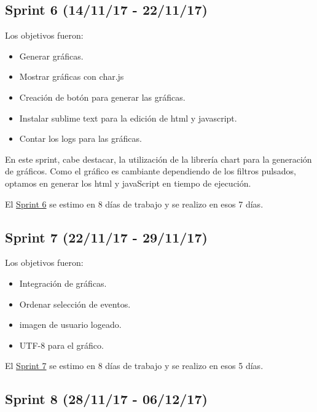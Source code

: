 \subsection{Sprint 6 (14/11/17 -
	22/11/17)}\label{sprint-6-141117---221117}

Los objetivos fueron:
\begin{itemize}
	\tightlist
	\item
	Generar gráficas.
	\item
	Mostrar gráficas con char.js \cite{javascript:chart}
	\item
	Creación de botón para generar las gráficas.	
	\item
	Instalar sublime text para la edición de html y javascript.
	\item
	Contar los logs para las gráficas.
	
\end{itemize}

En este sprint, cabe destacar, la utilización de la librería chart para la generación de gráficos. Como el gráfico es cambiante dependiendo de los filtros pulsados, optamos en generar los html y javaScript en tiempo de ejecución.

El \href{https://github.com/trona85/GII-17.1B-UBULog-1.0/milestone/6?closed=1}{Sprint 6} se estimo en 8 días de trabajo y se realizo en esos 7 días.


\subsection{Sprint 7 (22/11/17 -
	29/11/17)}\label{sprint-7-221117---291117}

Los objetivos fueron:
\begin{itemize}
	\tightlist
	\item
	Integración de gráficas.
	\item
	Ordenar selección de eventos.
	\item
	imagen de usuario logeado.	
	\item
	UTF-8 para el gráfico.
	
\end{itemize}

El \href{https://github.com/trona85/GII-17.1B-UBULog-1.0/milestone/7?closed=1}{Sprint 7} se estimo en 8 días de trabajo y se realizo en esos 5 días.


\subsection{Sprint 8 (28/11/17 -
	06/12/17)}\label{sprint-8-281117---061217}

